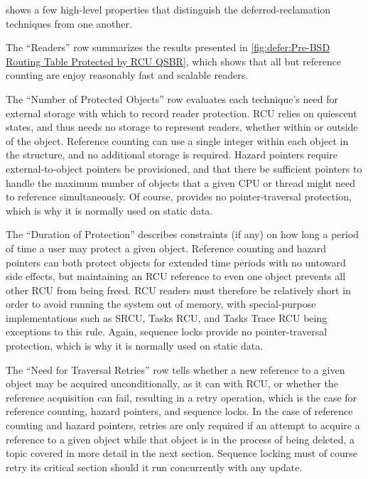shows a few high-level properties that distinguish the deferred-reclamation
techniques from one another.

The ``Readers'' row summarizes the results presented in
\cref{fig:defer:Pre-BSD Routing Table Protected by RCU QSBR},
which shows that all but reference counting are enjoy reasonably
fast and scalable readers.

The ``Number of Protected Objects'' row evaluates each technique's need
for external storage with which to record reader protection.
RCU relies on quiescent states, and thus needs no storage to represent
readers, whether within or outside of the object.
Reference counting can use a single integer within each object in the
structure, and no additional storage is required.
Hazard pointers require external-to-object pointers be provisioned,
and that there be sufficient pointers to handle the maximum number of
objects that a given CPU or thread might need to reference simultaneously.
Of course,  provides no pointer-traversal protection,
which is why it is normally used on static data.

\QuickQuizEnd

The ``Duration of Protection'' describes constraints (if any) on how
long a period of time a user may protect a given object.
Reference counting and hazard pointers can both protect objects for
extended time periods with no untoward side effects, but
maintaining an RCU reference to even one object prevents all other RCU
from being freed.
RCU readers must therefore be relatively short in order to avoid running
the system out of memory, with special-purpose implementations such
as SRCU, Tasks RCU, and Tasks Trace RCU being exceptions to this rule.
Again, sequence locks provide no pointer-traversal protection,
which is why it is normally used on static data.

The ``Need for Traversal Retries'' row tells whether a new reference to
a given object may be acquired unconditionally, as it can with RCU, or
whether the reference acquisition can fail, resulting in a retry
operation, which is the case for reference counting, hazard pointers,
and sequence locks.
In the case of reference counting and hazard pointers, retries are only
required if an attempt to acquire a reference to a given object while
that object is in the process of being deleted, a topic covered in more
detail in the next section.
Sequence locking must of course retry its critical section should it
run concurrently with any update.

